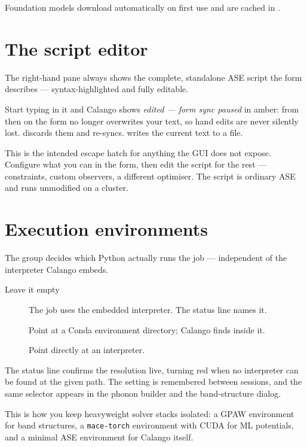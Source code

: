 Foundation models download automatically on first use and are cached in
.

\section{The script editor}

The right-hand pane always shows the complete, standalone ASE script the
form describes --- syntax-highlighted and fully editable.

Start typing in it and Calango shows \emph{edited --- form sync paused} in
amber: from then on the form no longer overwrites your text, so hand edits
are never silently lost.  discards them and re-syncs.
 writes the current text to a  file.

\begin{caltip}
This is the intended escape hatch for anything the GUI does not expose.
Configure what you can in the form, then edit the script for the rest ---
constraints, custom observers, a different optimiser. The script is
ordinary ASE and runs unmodified on a cluster.
\end{caltip}

\section{Execution environments}
\label{sec:exec-env}

The  group decides which Python actually runs the
job --- independent of the interpreter Calango embeds.

\begin{description}
  \item[Leave it empty] The job uses the embedded interpreter. The status
    line names it.
  \item[] Point at a Conda environment directory;
    Calango finds  inside it.
  \item[] Point directly at an interpreter.
\end{description}

The status line confirms the resolution live, turning red when no
interpreter can be found at the given path. The setting is remembered
between sessions, and the same selector appears in the phonon builder and
the band-structure dialog.

\begin{caltip}
This is how you keep heavyweight solver stacks isolated: a GPAW environment
for band structures, a \texttt{mace-torch} environment with CUDA for ML
potentials, and a minimal ASE environment for Calango itself.
\end{caltip}

